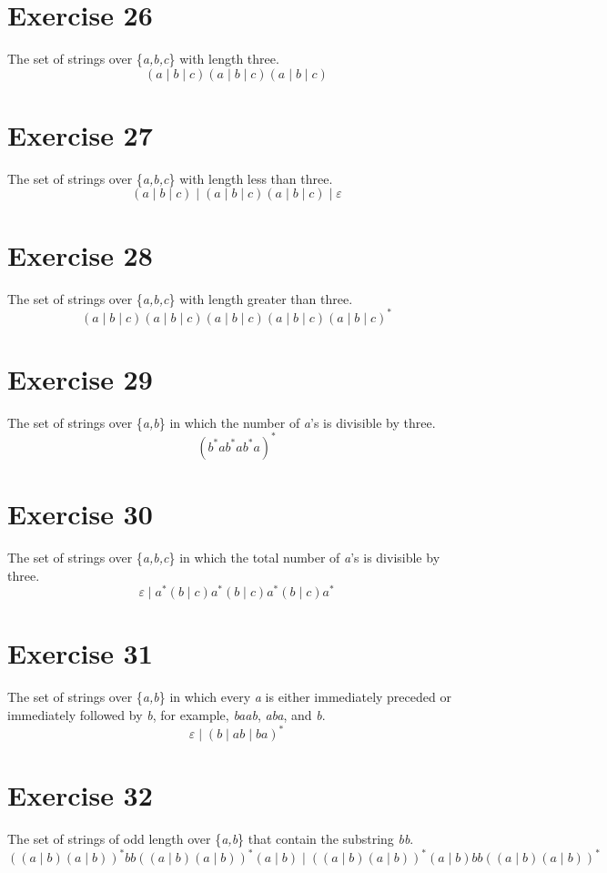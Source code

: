 \documentclass{report}
\begin{document}
\section*{Exercise 26}
The set of strings over \{\textit{a,b,c}\} with length three.
\newline
$$(a \mid b \mid c)(a \mid b \mid c)(a \mid b \mid c)$$
\section*{Exercise 27}
The set of strings over \{\textit{a,b,c}\} with length less than three.
\newline
$$(a \mid b \mid c)  \mid  (a \mid b \mid c)(a \mid b \mid c)  \mid  \varepsilon $$
\section*{Exercise 28}
The set of strings over \{\textit{a,b,c}\} with length greater than three.
\newline
$$(a \mid b \mid c)(a \mid b \mid c)(a \mid b \mid c)(a \mid b \mid c)(a \mid b \mid c)^*$$

\section*{Exercise 29}
The set of strings over \{\textit{a,b}\} in which the number of \textit{a}'s is divisible by three.
\newline
$$(b^*ab^*ab^*a)^*$$

\section*{Exercise 30}
The set of strings over \{\textit{a,b,c}\} in which the total number of \textit{a}'s is divisible by three.
\newline
$$\varepsilon  \mid  a^*(b \mid c)a^*(b \mid c)a^*(b \mid c)a^*$$

\section*{Exercise 31}
The set of strings over \{\textit{a,b}\} in which every \textit{a} is either immediately preceded or immediately followed by \textit{b}, for example, \textit{baab}, \textit{aba}, and \textit{b}.
\newline
$$\varepsilon  \mid  (b \mid ab \mid ba)^*$$

\section*{Exercise 32}
The set of strings of odd length over \{\textit{a,b}\} that contain the substring \textit{bb}.
\newline
$$((a \mid b)(a \mid b))^*bb((a \mid b)(a \mid b))^*(a \mid b)  \mid  ((a \mid b)(a \mid b))^*(a \mid b)bb((a \mid b)(a \mid b))^*$$
\end{document}

